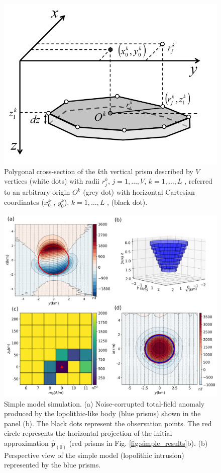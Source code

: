 \begin{figure}
    \centering
    \includegraphics[scale=0.3]{figures/prism_parameters_mod.png}
    \caption{Polygonal cross-section of the $k$th vertical prism described by $V$ vertices (white dots) with radii $r^k_j$, $j = 1, \dots, V$, $k = 1, \dots, L$ , referred to an arbitrary origin $O^k$ (grey dot) with horizontal Cartesian coordinates ($x_0^k$ , $y_0^k$), $k = 1, \dots, L$ , (black dot).}
    \label{fig:prism_parameters}
\end{figure}


\begin{figure}
    \centering
    \includegraphics[width=\linewidth]{figures/simple_model_data.png}
    \caption{Simple model simulation. (a) Noise-corrupted total-field anomaly produced by the lopolithic-like body (blue prisms) shown in the panel (b). The black dots represent the observation points. The red circle represents the horizontal projection 
    of the initial approximation $\hat{\mathbf{p}}_{(0)}$
    (red prisms in Fig. \ref{fig:simple_results}b).
    (b) Perspective view of the simple model (lopolithic intrusion) represented by the blue prisms.
}
    \label{fig:simple_model}
\end{figure}

